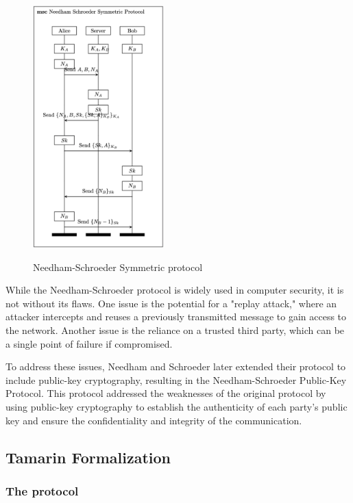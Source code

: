 \documentclass[fleqn,10pt]{SelfArx} %
\begin{document}
\begin{figure}[h]
    \centering
    \captionsetup{justification=centering, margin=1cm}
    \includegraphics[width=0.45\textwidth]{Figures/NS.png}
    \label{fig:NS}
    \caption{Needham-Schroeder Symmetric protocol}
\end{figure}
%

While the Needham-Schroeder protocol is widely used in computer security, it is not without its flaws. One issue is the potential for a "replay attack," where an attacker intercepts and reuses a previously transmitted message to gain access to the network. Another issue is the reliance on a trusted third party, which can be a single point of failure if compromised.

To address these issues, Needham and Schroeder later extended their protocol to include public-key cryptography, resulting in the Needham-Schroeder Public-Key Protocol. This protocol addressed the weaknesses of the original protocol by using public-key cryptography to establish the authenticity of each party's public key and ensure the confidentiality and integrity of the communication.

\subsection{Tamarin Formalization}

\subsubsection{The protocol}
\end{document}
